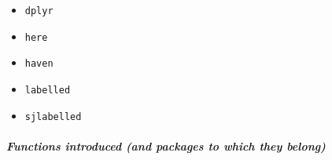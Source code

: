 \documentclass[
]{book}
\providecommand{\tightlist}{%
  \setlength{\itemsep}{0pt}\setlength{\parskip}{0pt}}
\begin{document}
\begin{itemize}
\tightlist
\item
  \texttt{dplyr}
\item
  \texttt{here}
\item
  \texttt{haven}
\item
  \texttt{labelled}
\item
  \texttt{sjlabelled}
\end{itemize}

\hypertarget{functions-introduced-and-packages-to-which-they-belong-1}{%
\paragraph*{\texorpdfstring{\emph{Functions introduced (and packages to which they belong)}}{Functions introduced (and packages to which they belong)}}\label{functions-introduced-and-packages-to-which-they-belong-1}}
\end{document}
